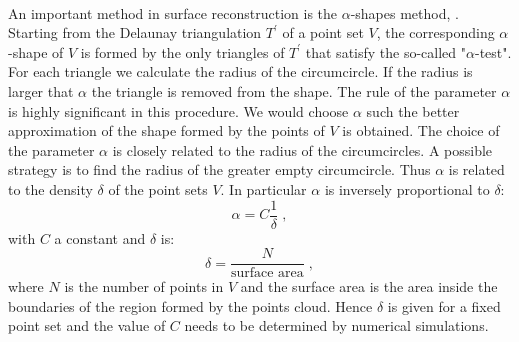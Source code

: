 \\ \indent An important method in surface reconstruction is the $\alpha$-shapes method, \cite{edelsbrunner2010alpha, guo1997surface}. Starting from the Delaunay triangulation $T^\prime$ of a point set $V$, the corresponding $\alpha$-shape of $V$ is formed by the only triangles of $T^\prime$ that satisfy the so-called "$\alpha$-test".
For each triangle we calculate the radius of the circumcircle. If the radius is larger that $\alpha$ the triangle is removed from the shape. The rule of the parameter $\alpha$ is highly significant in this procedure. We would choose $\alpha$ such the better approximation of the shape formed by the points of $V$ is obtained. 
The choice of the parameter $\alpha$ is closely related to the radius of the circumcircles. A possible strategy is to find the radius of the greater empty circumcircle. Thus $\alpha$ is related to the density $\delta$ of the point sets $V$. In particular $\alpha$ is inversely proportional to $\delta$:
\begin{equation}
\alpha=C\frac{1}{\delta}\;,
\end{equation}
with $C$ a constant and $\delta$ is:
\begin{equation}
\delta=\frac{N}{\mbox{surface area}}\; ,
\end{equation}
where $N$ is the number of points in $V$ and the surface area is the area inside the boundaries of the region formed by the points cloud. Hence $\delta$ is given for a fixed point set and the value of $C$ needs to be determined by numerical simulations.\\

